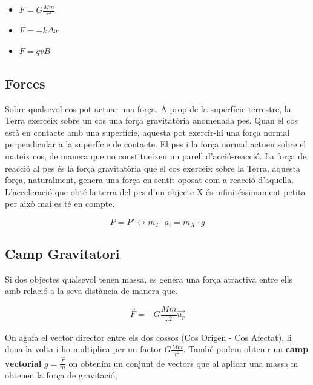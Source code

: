 \documentclass[12pt]{article}
\begin{document}
\begin{itemize}
    \item $F = G\frac{Mm}{r^2}$
    \item $F = -k\Delta x$
    \item $F = qvB$
\end{itemize}

\subsection{Forces}

Sobre qualsevol cos pot actuar una força. A prop de la superfície terrestre, la Terra exerceix sobre un cos una força gravitatòria anomenada pes. Quan el cos està en contacte amb una superfície, aquesta pot exercir-hi una força normal perpendicular a la superfície de contacte. El pes i la força normal actuen sobre el mateix cos, de manera que no constitueixen un parell d’acció-reacció. La força de reacció al pes és la força gravitatòria que el cos exerceix sobre la Terra, aquesta força, naturalment, genera una força en sentit oposat com a reacció d'aquella. L'acceleració que obté la terra del pes d'un objecte X és infinitéssimament petita per això mai es té en compte.

\[P = P' \leftrightarrow m_T \cdot a_t = m_X \cdot g\]

\begin{center}
\end{center}

\subsection{Camp Gravitatori}

Si dos objectes qualsevol tenen massa, es genera una força atractiva entre ells amb relació a la seva distància de manera que.

\[\vec{F} = - G\frac{Mm}{r^2} \vec{u_r}\]

On agafa el vector director entre els dos cossos (Cos Origen - Cos Afectat), li dona la volta i ho multiplica per un factor $G\frac{Mm}{r^2}$. També podem obtenir un \textbf{camp vectorial} $g = \frac{\vec{F}}{m}$ on obtenim un conjunt de vectors que al aplicar una massa m obtenen la força de gravitació,
\end{document}
